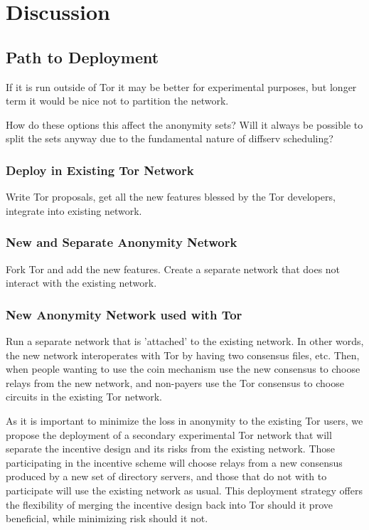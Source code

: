 \section{Discussion} \label{disc}


\subsection{Path to Deployment}

If it is run outside of Tor it may be better for experimental purposes, but longer term it would be nice not to partition the network.

How do these options this affect the anonymity sets? Will it always be possible to split the sets anyway due to the fundamental nature of diffserv scheduling?

\subsubsection{Deploy in Existing Tor Network}

Write Tor proposals, get all the new features blessed by the Tor developers, integrate into existing network.

\subsubsection{New and Separate Anonymity Network}

Fork Tor and add the new features. Create a separate network that does not interact with the existing network.

\subsubsection{New Anonymity Network used with Tor}

Run a separate network that is 'attached' to the existing network. In other words, the new network interoperates with Tor by having two consensus files, etc. Then, when people wanting to use the coin mechanism use the new consensus to choose relays from the new network, and non-payers use the Tor consensus to choose circuits in the existing Tor network.

As it is important to minimize the loss in anonymity to the existing Tor users,
we propose the deployment of a secondary experimental Tor network that will
separate the incentive design and its risks from the existing network. Those
participating in the incentive scheme will choose relays from a new consensus
produced by a new set of directory servers, and those that do not with to
participate will use the existing network as usual. This deployment strategy
offers the flexibility of merging the incentive design back into Tor should it
prove beneficial, while minimizing risk should it not.


